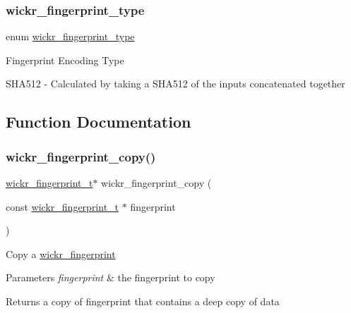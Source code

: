 \subsubsection{\texorpdfstring{wickr\_fingerprint\_type}{wickr\_fingerprint\_type}}
{\footnotesize\ttfamily enum \mbox{\hyperlink{group__wickr__fingerprint_ga09d6f8936a6d1fbacb13c643c2e81810}{wickr\+\_\+fingerprint\+\_\+type}}}

Fingerprint Encoding Type

S\+H\+A512 -\/ Calculated by taking a S\+H\+A512 of the inputs concatenated together 

\subsection{Function Documentation}
\mbox{\label{group__wickr__fingerprint_gac2497b535d0864b0fcc91004a979a313}} 
\subsubsection{\texorpdfstring{wickr\_fingerprint\_copy()}{wickr\_fingerprint\_copy()}}
{\footnotesize\ttfamily \mbox{\hyperlink{structwickr__fingerprint}{wickr\+\_\+fingerprint\+\_\+t}}$\ast$ wickr\+\_\+fingerprint\+\_\+copy (\begin{DoxyParamCaption}\item[{const \mbox{\hyperlink{structwickr__fingerprint}{wickr\+\_\+fingerprint\+\_\+t}} $\ast$}]{fingerprint }\end{DoxyParamCaption})}

Copy a \mbox{\hyperlink{structwickr__fingerprint}{wickr\+\_\+fingerprint}}


\begin{DoxyParams}{Parameters}
{\em fingerprint} & the fingerprint to copy \\
\hline
\end{DoxyParams}
\begin{DoxyReturn}{Returns}
a copy of \textquotesingle{}fingerprint\textquotesingle{} that contains a deep copy of \textquotesingle{}data\textquotesingle{} 
\end{DoxyReturn}
\mbox{\label{group__wickr__fingerprint_gac796adfe045ef69852ec1f452880add4}} 
